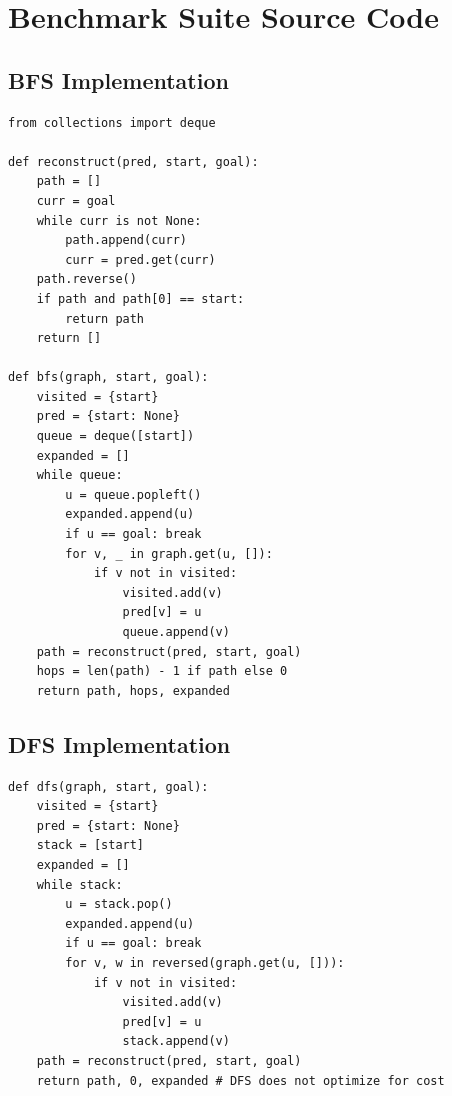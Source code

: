 \documentclass[12pt, a4paper, oneside]{report}
\theoremstyle{definition}
\begin{document}
\appendix

\chapter{Benchmark Suite Source Code}

\section{BFS Implementation}

\begin{lstlisting}[caption={Complete BFS with distance and path reconstruction (from core.algorithms)}]
from collections import deque

def reconstruct(pred, start, goal):
    path = []
    curr = goal
    while curr is not None:
        path.append(curr)
        curr = pred.get(curr)
    path.reverse()
    if path and path[0] == start:
        return path
    return []

def bfs(graph, start, goal):
    visited = {start}
    pred = {start: None}
    queue = deque([start])
    expanded = []
    while queue:
        u = queue.popleft()
        expanded.append(u)
        if u == goal: break
        for v, _ in graph.get(u, []):
            if v not in visited:
                visited.add(v)
                pred[v] = u
                queue.append(v)
    path = reconstruct(pred, start, goal)
    hops = len(path) - 1 if path else 0
    return path, hops, expanded
\end{lstlisting}

\section{DFS Implementation}

\begin{lstlisting}[caption={Complete DFS implementation (from core.algorithms)}]
def dfs(graph, start, goal):
    visited = {start}
    pred = {start: None}
    stack = [start]
    expanded = []
    while stack:
        u = stack.pop()
        expanded.append(u)
        if u == goal: break
        for v, w in reversed(graph.get(u, [])):
            if v not in visited:
                visited.add(v)
                pred[v] = u
                stack.append(v)
    path = reconstruct(pred, start, goal)
    return path, 0, expanded # DFS does not optimize for cost
\end{lstlisting}
\end{document}

